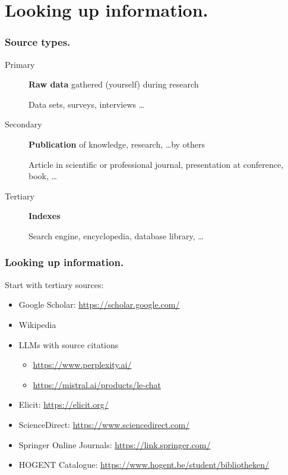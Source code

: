\documentclass[aspectratio=169]{beamer}
\begin{document}
\section{Looking up information.}

\begin{frame}
    \frametitle{Source types.}

    \begin{description}
        \item[Primary] \textbf{Raw data} gathered (yourself) during research

            Data sets, surveys, interviews \ldots

        \item[Secondary] \textbf{Publication} of knowledge, research, \ldots by others

            Article in scientific or professional journal, presentation at conference, book, \ldots

        \item[Tertiary] \textbf{Indexes}

            Search engine, encyclopedia, database library, \ldots

    \end{description}
	\bigskip
\end{frame}

\begin{frame}
    \frametitle{Looking up information.}

    Start with \alert{tertiary} sources:

    \begin{itemize}
        \item Google Scholar: \url{https://scholar.google.com/}
        \item Wikipedia
        \item LLMs with source citations
        	\begin{itemize}
        		\item \url{https://www.perplexity.ai/}
        		\item \url{https://mistral.ai/products/le-chat}
        	\end{itemize}
        \item Elicit: \url{https://elicit.org/}
        \item ScienceDirect: \url{https://www.sciencedirect.com/}
        \item Springer Online Journals: \url{https://link.springer.com/}
        \item HOGENT Catalogue: \url{https://www.hogent.be/student/bibliotheken/}

    \end{itemize}
\end{frame}
\end{document}
